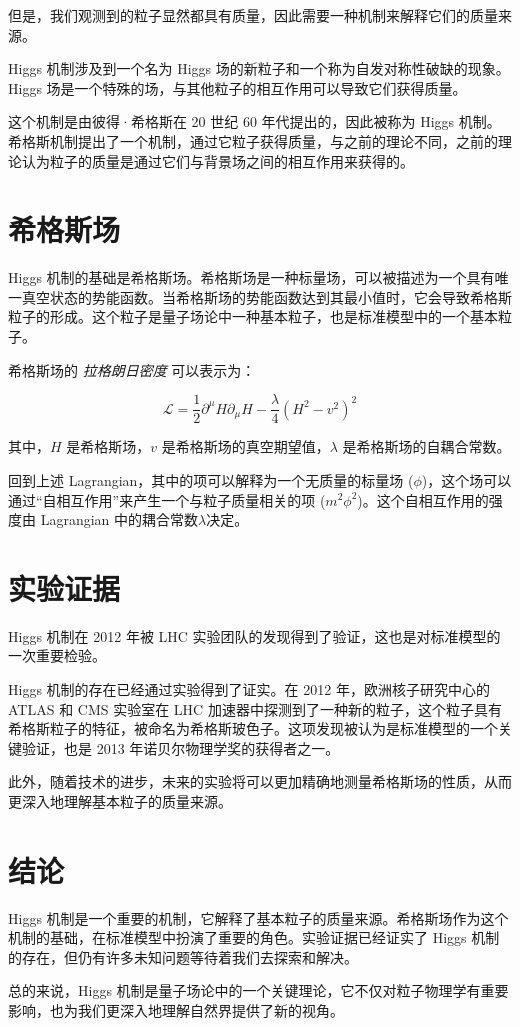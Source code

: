 但是，我们观测到的粒子显然都具有质量，因此需要一种机制来解释它们的质量来源。

Higgs 机制涉及到一个名为 Higgs 场的新粒子和一个称为自发对称性破缺的现象。Higgs 场是一个特殊的场，与其他粒子的相互作用可以导致它们获得质量。

这个机制是由彼得·希格斯在 20 世纪 60 年代提出的，因此被称为 Higgs 机制。希格斯机制提出了一个机制，通过它粒子获得质量，与之前的理论不同，之前的理论认为粒子的质量是通过它们与背景场之间的相互作用来获得的。

\section{希格斯场}

Higgs 机制的基础是希格斯场。希格斯场是一种标量场，可以被描述为一个具有唯一真空状态的势能函数。当希格斯场的势能函数达到其最小值时，它会导致希格斯粒子的形成。这个粒子是量子场论中一种基本粒子，也是标准模型中的一个基本粒子。

希格斯场的 \emph{拉格朗日密度} 可以表示为：

\begin{equation}
    \mathcal{L}=\frac{1}{2} \partial^\mu H \partial_\mu H - \frac{\lambda}{4} \left(H^2-v^2\right)^2
\end{equation}

\noindent 其中，$H$ 是希格斯场，$v$ 是希格斯场的真空期望值，$\lambda$ 是希格斯场的自耦合常数。

回到上述 Lagrangian，其中的项可以解释为一个无质量的标量场 ($\phi$)，这个场可以通过“自相互作用”来产生一个与粒子质量相关的项 ($m^2\phi^2$)。这个自相互作用的强度由 Lagrangian 中的耦合常数$\lambda$决定。

\section{实验证据}

Higgs 机制在 2012 年被 LHC 实验团队的发现得到了验证，这也是对标准模型的一次重要检验。

Higgs 机制的存在已经通过实验得到了证实。在 2012 年，欧洲核子研究中心的 ATLAS 和 CMS 实验室在 LHC 加速器中探测到了一种新的粒子，这个粒子具有希格斯粒子的特征，被命名为希格斯玻色子。这项发现被认为是标准模型的一个关键验证，也是 2013 年诺贝尔物理学奖的获得者之一。

此外，随着技术的进步，未来的实验将可以更加精确地测量希格斯场的性质，从而更深入地理解基本粒子的质量来源。

\section{结论}

Higgs 机制是一个重要的机制，它解释了基本粒子的质量来源。希格斯场作为这个机制的基础，在标准模型中扮演了重要的角色。实验证据已经证实了 Higgs 机制的存在，但仍有许多未知问题等待着我们去探索和解决。

总的来说，Higgs 机制是量子场论中的一个关键理论，它不仅对粒子物理学有重要影响，也为我们更深入地理解自然界提供了新的视角。
